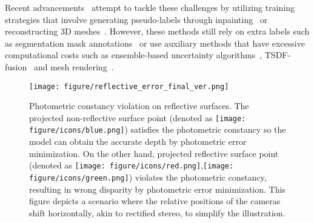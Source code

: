 Recent advancements~\citep{costanzino2023learning, shi20233d} attempt to tackle these challenges by utilizing training strategies that involve generating pseudo-labels through inpainting~\citep{costanzino2023learning} or reconstructing 3D meshes~\citep{shi20233d}.
However, these methods still rely on extra labels such as segmentation mask annotations~\citep{costanzino2023learning} or use auxiliary methods that have excessive computational costs such as ensemble-based uncertainty algorithms~\citep{shi20233d}, TSDF-fusion~\citep{newcombe2011kinectfusion} and mesh rendering~\citep{pyrender}.

\begin{figure}[t]
\begin{center}
  \texttt{[image: figure/reflective\_error\_final\_ver.png]}
\end{center}
\caption{Photometric constancy violation on reflective surfaces. The projected non-reflective surface point (denoted as \texttt{[image: figure/icons/blue.png]}) satisfies the photometric constancy so the model can obtain the accurate depth by photometric error minimization. On the other hand, projected reflective surface point (denoted as \texttt{[image: figure/icons/red.png]},\texttt{[image: figure/icons/green.png]}) violates the photometric constancy, resulting in wrong disparity by photometric error minimization. This figure depicts a scenario where the relative positions of the cameras shift horizontally, akin to rectified stereo, to simplify the illustration.}
\label{fig:reflective_error}
\end{figure}

